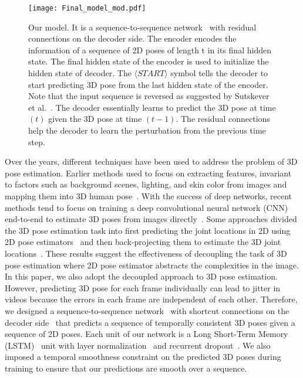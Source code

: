 \documentclass[runningheads]{llncs}
\begin{document}
\begin{figure*}
\centering
\texttt{[image: Final\_model\_mod.pdf]}
\caption{Our model. It is a sequence-to-sequence network~\cite{sutskever2014sequence} with residual connections on the decoder side. The encoder encodes the information of a sequence of 2D poses of length t in its final hidden state. The final hidden state of the encoder is used to initialize the hidden state of decoder. The $\langle START \rangle$ symbol tells the decoder to start predicting 3D pose from the last hidden state of the encoder.  Note that the input sequence is reversed as suggested by Sutskever et al.~\cite{sutskever2014sequence}.  The decoder essentially learns to predict the 3D pose at time $(t)$ given the 3D pose at time $(t-1)$. The residual connections help the decoder to learn the perturbation from the previous time step.}
\vspace{-3mm}
\label{fig:network_model}   \end{figure*}


Over the years, different techniques have been used to address the problem of 3D pose estimation. Earlier methods used to focus on extracting features, invariant to factors such as background scenes, lighting, and skin color from images and mapping them into 3D human pose~\cite{AgarwalT04,bb93102,bb41073,bb93266}. With the success of deep networks, recent methods tend to focus on training a deep convolutional neural network (CNN) end-to-end to estimate 3D poses from images directly~\cite{tekin2016structured,volumetric,li20143d,mehta2016monocular,zhou2016deep,mehta2017vnect,niemonocular,linCVPR17RPSM,park20163d,sun2017compositional,tekin2017learning}. Some approaches divided the 3D pose estimation task into first predicting the joint locations in 2D using 2D pose estimators~\cite{cpm,stacked-hourglass} and then back-projecting them to estimate the 3D joint locations~\cite{ramakrishna2012reconstructing,zhou2016sparseness,akhter2015pose,bogo2016keep,distance-matrix,JMartinez:ICCV:2017}. These results suggest the effectiveness of decoupling the task of 3D pose estimation where 2D pose estimator abstracts the complexities in the image. In this paper, we also adopt the decoupled approach to 3D pose estimation. However, predicting 3D pose for each frame individually can lead to jitter in videos because the errors in each frame are independent of each other. Therefore, we designed a sequence-to-sequence network~\cite{sutskever2014sequence} with shortcut connections on the decoder side~\cite{he2016deep} that predicts a sequence of temporally consistent 3D poses given a sequence of 2D poses. Each unit of our network is a Long Short-Term Memory (LSTM)~\cite{hochreiter1997long} unit with layer normalization~\cite{ba2016layer} and recurrent dropout~\cite{zaremba2014recurrent}. We also imposed a temporal smoothness constraint on the predicted 3D poses during training to ensure that our predictions are smooth over a sequence. 
\end{document}
